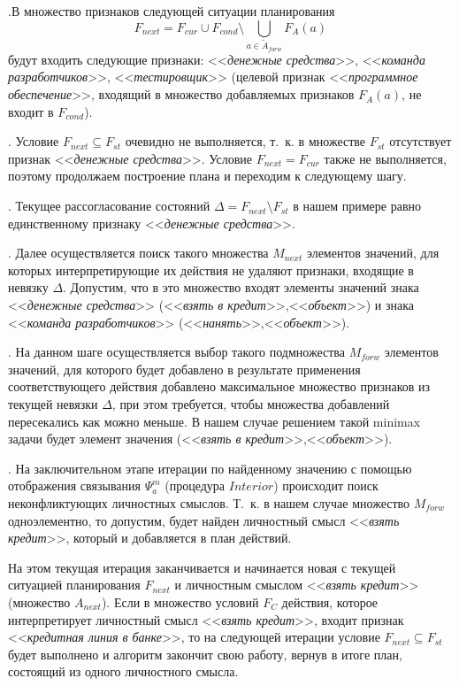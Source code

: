 \documentclass[a4paper, 12pt]{article}
\theoremstyle{break}
\numberwithin{equation}{section}
\begin{document}
	.В множество признаков следующей ситуации планирования
	\begin{equation*}
		F_{next}=F_{cur}\cup F_{cond}\setminus\bigcup\limits_{a\in \tilde A_{forw}}F_A(a)
	\end{equation*}
	 будут входить следующие признаки: <<\textit{денежные средства}>>, <<\textit{команда разработчиков}>>, <<\textit{тестировщик}>> (целевой признак <<\textit{программное обеспечение}>>, входящий в множество добавляемых признаков $F_A(a)$, не входит в $F_{cond}$).
	
	. Условие $F_{next}\subseteq F_{st}$ очевидно не выполняется, т.~к. в множестве $F_{st}$ отсутствует признак <<\textit{денежные средства}>>. Условие $F_{next}=F_{cur}$ также не выполняется, поэтому продолжаем построение плана и переходим к следующему шагу.
	
	. Текущее рассогласование состояний $\Delta=F_{next}\setminus F_{st}$ в нашем примере равно единственному признаку <<\textit{денежные средства}>>.
	
	. Далее осуществляется поиск такого множества $M_{next}$ элементов значений, для которых интерпретирующие их действия не удаляют признаки, входящие в невязку $\Delta$. Допустим, что в это множество входят элементы значений знака <<\textit{денежные средства}>> (<<\textit{взять в кредит}>>,<<\textit{объект}>>) и знака <<\textit{команда разработчиков}>> (<<\textit{нанять}>>,<<\textit{объект}>>).
	
	. На данном шаге осуществляется выбор такого подмножества $M_{forw}$ элементов значений, для которого будет добавлено в результате применения соответствующего действия добавлено максимальное множество признаков из текущей невязки $\Delta$, при этом требуется, чтобы множества добавлений пересекались как можно меньше. В нашем случае решением такой minimax задачи будет элемент значения (<<\textit{взять в кредит}>>,<<\textit{объект}>>).
	
	. На заключительном этапе итерации по найденному значению с помощью отображения связывания $\Psi_a^m$ (процедура $Interior$) происходит поиск неконфликтующих личностных смыслов. Т.~к. в нашем случае множество $M_{forw}$ одноэлементно, то допустим, будет найден личностный смысл <<\textit{взять кредит}>>, который и добавляется в план действий.
	
	На этом текущая итерация заканчивается и начинается новая с текущей ситуацией планирования $F_{next}$ и личностным смыслом <<\textit{взять кредит}>> (множество $A_{next}$). Если в множество условий $F_C$ действия, которое интерпретирует личностный смысл <<\textit{взять кредит}>>, входит признак <<\textit{кредитная линия в банке}>>, то на следующей итерации условие $F_{next}\subseteq F_{st}$ будет выполнено и алгоритм закончит свою работу, вернув в итоге план, состоящий из одного личностного смысла.
	
\end{document}
